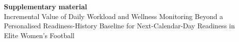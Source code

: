 \documentclass[11pt]{article}
\begin{document}
\begin{center}
{\Large \textbf{Supplementary material}}\\[0.4em]
{\large Incremental Value of Daily Workload and Wellness Monitoring Beyond a Personalised Readiness-History Baseline for Next-Calendar-Day Readiness in Elite Women's Football}
\end{center}
\vspace{1em}

\end{document}
